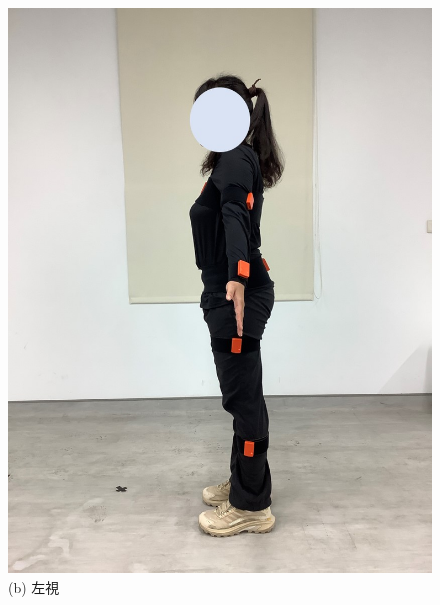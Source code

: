 \begin{figure}[!ht]
\begin{minipage}{.25\textwidth}
      \includegraphics[width=.95\linewidth]{figure/ch3_fig_leftimu.JPG}
      \caption*{(b) 左視}
   \end{minipage}%
   \begin{minipage}{.25\textwidth}
      \centering

\end{minipage}
\end{figure}
